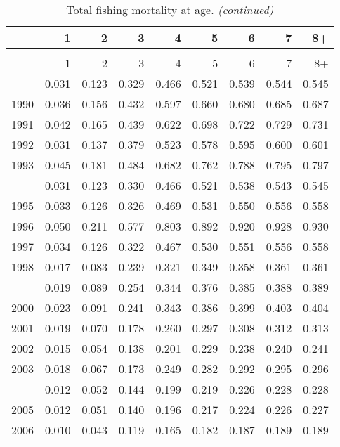 \documentclass[
]{article}
\begin{document}
\begin{longtable}[t]{lrrrrrrrr}
\caption{\label{tab:FAA-tot-table}Total fishing mortality at age.}\\
\toprule
  & 1 & 2 & 3 & 4 & 5 & 6 & 7 & 8+\\
\midrule
\endfirsthead
\caption[]{Total fishing mortality at age. \textit{(continued)}}\\
\toprule
  & 1 & 2 & 3 & 4 & 5 & 6 & 7 & 8+\\
\midrule
\endhead

\endfoot
\bottomrule
\endlastfoot
1989 & 0.031 & 0.123 & 0.329 & 0.466 & 0.521 & 0.539 & 0.544 & 0.545\\
1990 & 0.036 & 0.156 & 0.432 & 0.597 & 0.660 & 0.680 & 0.685 & 0.687\\
1991 & 0.042 & 0.165 & 0.439 & 0.622 & 0.698 & 0.722 & 0.729 & 0.731\\
1992 & 0.031 & 0.137 & 0.379 & 0.523 & 0.578 & 0.595 & 0.600 & 0.601\\
1993 & 0.045 & 0.181 & 0.484 & 0.682 & 0.762 & 0.788 & 0.795 & 0.797\\
\addlinespace
1994 & 0.031 & 0.123 & 0.330 & 0.466 & 0.521 & 0.538 & 0.543 & 0.545\\
1995 & 0.033 & 0.126 & 0.326 & 0.469 & 0.531 & 0.550 & 0.556 & 0.558\\
1996 & 0.050 & 0.211 & 0.577 & 0.803 & 0.892 & 0.920 & 0.928 & 0.930\\
1997 & 0.034 & 0.126 & 0.322 & 0.467 & 0.530 & 0.551 & 0.556 & 0.558\\
1998 & 0.017 & 0.083 & 0.239 & 0.321 & 0.349 & 0.358 & 0.361 & 0.361\\
\addlinespace
1999 & 0.019 & 0.089 & 0.254 & 0.344 & 0.376 & 0.385 & 0.388 & 0.389\\
2000 & 0.023 & 0.091 & 0.241 & 0.343 & 0.386 & 0.399 & 0.403 & 0.404\\
2001 & 0.019 & 0.070 & 0.178 & 0.260 & 0.297 & 0.308 & 0.312 & 0.313\\
2002 & 0.015 & 0.054 & 0.138 & 0.201 & 0.229 & 0.238 & 0.240 & 0.241\\
2003 & 0.018 & 0.067 & 0.173 & 0.249 & 0.282 & 0.292 & 0.295 & 0.296\\
\addlinespace
2004 & 0.012 & 0.052 & 0.144 & 0.199 & 0.219 & 0.226 & 0.228 & 0.228\\
2005 & 0.012 & 0.051 & 0.140 & 0.196 & 0.217 & 0.224 & 0.226 & 0.227\\
2006 & 0.010 & 0.043 & 0.119 & 0.165 & 0.182 & 0.187 & 0.189 & 0.189\\

\end{longtable}
\end{document}
